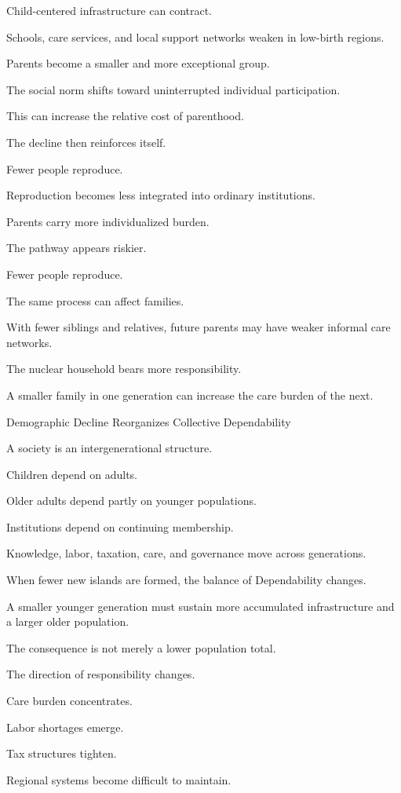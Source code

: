 Child-centered infrastructure can contract.

Schools, care services, and local support networks weaken in low-birth regions.

Parents become a smaller and more exceptional group.

The social norm shifts toward uninterrupted individual participation.

This can increase the relative cost of parenthood.

The decline then reinforces itself.

Fewer people reproduce.

Reproduction becomes less integrated into ordinary institutions.

Parents carry more individualized burden.

The pathway appears riskier.

Fewer people reproduce.

The same process can affect families.

With fewer siblings and relatives, future parents may have weaker informal care networks.

The nuclear household bears more responsibility.

A smaller family in one generation can increase the care burden of the next.

Demographic Decline Reorganizes Collective Dependability

A society is an intergenerational structure.

Children depend on adults.

Older adults depend partly on younger populations.

Institutions depend on continuing membership.

Knowledge, labor, taxation, care, and governance move across generations.

When fewer new islands are formed, the balance of Dependability changes.

A smaller younger generation must sustain more accumulated infrastructure and a larger older population.

The consequence is not merely a lower population total.

The direction of responsibility changes.

Care burden concentrates.

Labor shortages emerge.

Tax structures tighten.

Regional systems become difficult to maintain.

